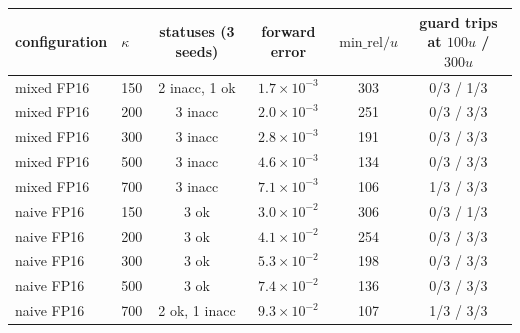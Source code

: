 \begin{tabular}{llcccc}
\toprule
configuration & $\kappa$ & statuses (3 seeds) & forward error & $\mathrm{min\_rel}/u$ & guard trips at $100u$ / $300u$\\
\midrule
mixed FP16 & 150 & 2 inacc, 1 ok & $1.7\!\times\!10^{-3}$ & 303 & 0/3 / 1/3\\
mixed FP16 & 200 & 3 inacc & $2.0\!\times\!10^{-3}$ & 251 & 0/3 / 3/3\\
mixed FP16 & 300 & 3 inacc & $2.8\!\times\!10^{-3}$ & 191 & 0/3 / 3/3\\
mixed FP16 & 500 & 3 inacc & $4.6\!\times\!10^{-3}$ & 134 & 0/3 / 3/3\\
mixed FP16 & 700 & 3 inacc & $7.1\!\times\!10^{-3}$ & 106 & 1/3 / 3/3\\
naive FP16 & 150 & 3 ok & $3.0\!\times\!10^{-2}$ & 306 & 0/3 / 1/3\\
naive FP16 & 200 & 3 ok & $4.1\!\times\!10^{-2}$ & 254 & 0/3 / 3/3\\
naive FP16 & 300 & 3 ok & $5.3\!\times\!10^{-2}$ & 198 & 0/3 / 3/3\\
naive FP16 & 500 & 3 ok & $7.4\!\times\!10^{-2}$ & 136 & 0/3 / 3/3\\
naive FP16 & 700 & 2 ok, 1 inacc & $9.3\!\times\!10^{-2}$ & 107 & 1/3 / 3/3\\
\bottomrule
\end{tabular}
